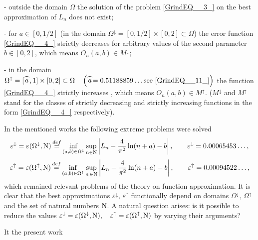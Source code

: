 \documentclass[
11pt,%
tightenlines,%
twoside,%
onecolumn,%
nofloats,%
nobibnotes,%
nofootinbib,%
superscriptaddress,%
noshowpacs,%
centertags]%
{revtex4}
\begin{document}
- outside the domain $\Omega $ the solution of the problem \eqref{GrindEQ__3_} on the best approximation of $L_{n}$  does not exist;

- for $a\in [0, 1/2]$ \big(in the domain $\Omega ^{\downarrow }  =[0, 1/2]\times [0,  2] \subset \Omega $\big) the error function \eqref{GrindEQ__4_} strictly decreases \cite{Sh18} for arbitrary values of the second parameter $ b\in  [0, 2] $, which means $O_{n} (a, b)\in  M^{\downarrow }$;

- in the domain $\Omega ^{\uparrow }  =[\stackrel{\frown}{a}, 1]\times [0,  2] \subset \Omega  \quad \left(\stackrel{\frown}{a} =  0.51188859\dots \text{see \eqref{GrindEQ__11_}}\right)$ the function \eqref{GrindEQ__4_} strictly increases \cite{Sh19}, which means $O_{n} (a,b)\in M^{\uparrow }  $. ($M^{\downarrow }$ and $M^{\uparrow } $ stand for the classes of strictly decreasing and strictly increasing functions in the form \eqref{GrindEQ__4_} respectively).

In the mentioned works the following extreme problems were solved
\begin{equation}\label{GrindEQ__5_}
\varepsilon ^{\downarrow }  = \varepsilon (\Omega ^{\downarrow }, {\rm N} ) \mathop{=}\limits^{def} \mathop{\inf }\limits_{(a, b) \in \Omega ^{\downarrow }  } \mathop{\sup }\limits_{n \in {\rm N} }  \left|L_{n} - \frac{4}{\pi ^{2} } \ln (n+a) - b\right|, \qquad \varepsilon ^{\downarrow } = 0.00065453\dots,
\end{equation}
\begin{equation}\label{GrindEQ__6_}
\varepsilon ^{\uparrow }=\varepsilon (\Omega ^{\uparrow }, {\rm N} ) \mathop{=}\limits^{def} \mathop{\inf }\limits_{(a, b) \in \Omega ^{\uparrow }}  \mathop{\sup }\limits_{n\, \in {\rm N} } \left|L_{n} -\frac{4}{\pi ^{2} } \ln (n+a) -b\right|, \qquad \varepsilon ^{\uparrow } = 0.00094522\dots ,
\end{equation}
which remained relevant problems of the theory on function approximation. It is clear that the best approximations $\varepsilon ^{\downarrow } ,\, \varepsilon ^{\uparrow }  $ functionally depend on domains $\Omega ^{\downarrow },\,  \Omega ^{\uparrow } $ and the set of natural numbers ${\rm N} $. A natural question arises: is it possible to reduce the values $\varepsilon ^{\downarrow } = \varepsilon (\Omega ^{\downarrow } , {\rm N} ),\quad \varepsilon ^{\uparrow } =\varepsilon (\Omega ^{\uparrow } , {\rm N} )$ by varying their arguments?

It the present work
\end{document}

